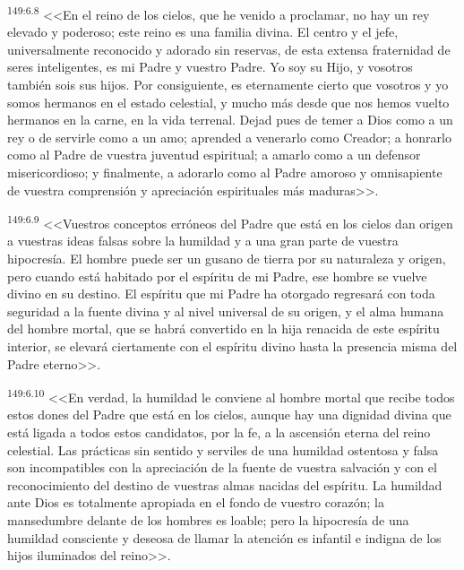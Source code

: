 \par 
\textsuperscript{149:6.8} <<En el reino de los cielos, que he venido a proclamar, no hay un rey elevado y poderoso; este reino es una familia divina. El centro y el jefe, universalmente reconocido y adorado sin reservas, de esta extensa fraternidad de seres inteligentes, es mi Padre y vuestro Padre. Yo soy su Hijo, y vosotros también sois sus hijos. Por consiguiente, es eternamente cierto que vosotros y yo somos hermanos en el estado celestial, y mucho más desde que nos hemos vuelto hermanos en la carne, en la vida terrenal. Dejad pues de temer a Dios como a un rey o de servirle como a un amo; aprended a venerarlo como Creador; a honrarlo como al Padre de vuestra juventud espiritual; a amarlo como a un defensor misericordioso; y finalmente, a adorarlo como al Padre amoroso y omnisapiente de vuestra comprensión y apreciación espirituales más maduras>>.

\par 
\textsuperscript{149:6.9} <<Vuestros conceptos erróneos del Padre que está en los cielos dan origen a vuestras ideas falsas sobre la humildad y a una gran parte de vuestra hipocresía. El hombre puede ser un gusano de tierra por su naturaleza y origen, pero cuando está habitado por el espíritu de mi Padre, ese hombre se vuelve divino en su destino. El espíritu que mi Padre ha otorgado regresará con toda seguridad a la fuente divina y al nivel universal de su origen, y el alma humana del hombre mortal, que se habrá convertido en la hija renacida de este espíritu interior, se elevará ciertamente con el espíritu divino hasta la presencia misma del Padre eterno>>.

\par 
\textsuperscript{149:6.10} <<En verdad, la humildad le conviene al hombre mortal que recibe todos estos dones del Padre que está en los cielos, aunque hay una dignidad divina que está ligada a todos estos candidatos, por la fe, a la ascensión eterna del reino celestial. Las prácticas sin sentido y serviles de una humildad ostentosa y falsa son incompatibles con la apreciación de la fuente de vuestra salvación y con el reconocimiento del destino de vuestras almas nacidas del espíritu. La humildad ante Dios es totalmente apropiada en el fondo de vuestro corazón; la mansedumbre delante de los hombres es loable; pero la hipocresía de una humildad consciente y deseosa de llamar la atención es infantil e indigna de los hijos iluminados del reino>>.

